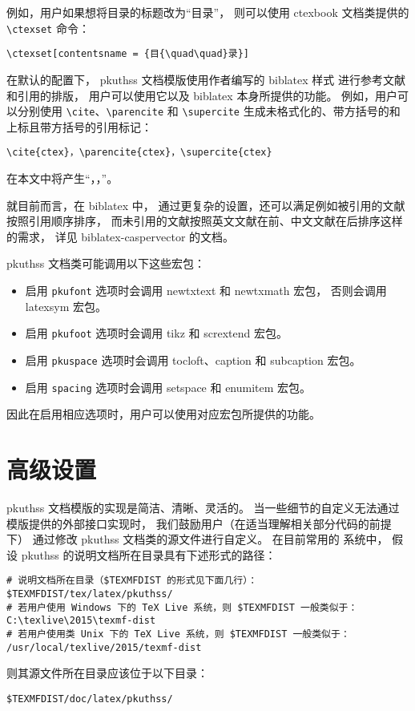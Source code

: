例如，用户如果想将目录的标题改为“目{\quad\quad}录”，
则可以使用 ctexbook 文档类提供的 \verb|\ctexset| 命令：
\begin{Verbatim}[frame = single]
\ctexset[contentsname = {目{\quad\quad}录}]
\end{Verbatim}

在默认的配置下，%
pkuthss 文档模版使用作者编写的 biblatex\supercite{biblatex} 样式%
\mbox{\supercite{biblatex-caspervector}}进行参考文献和引用的排版，
用户可以使用它以及 biblatex 本身所提供的功能。
例如，用户可以分别使用 \verb|\cite|、\verb|\parencite| 和 \verb|\supercite|
生成未格式化的、带方括号的和上标且带方括号的引用标记：
\begin{Verbatim}[frame = single]
\cite{ctex}，\parencite{ctex}，\supercite{ctex}
\end{Verbatim}
在本文中将产生“\cite{ctex}，\parencite{ctex}，\supercite{ctex}”。

就目前而言，在 biblatex 中，
通过更复杂的设置，还可以满足例如被引用的文献按照引用顺序排序，
而未引用的文献按照英文文献在前、中文文献在后排序这样的需求，
详见 biblatex-caspervector 的文档\supercite{biblatex-caspervector}。

pkuthss 文档类可能调用以下这些宏包：
\begin{itemize}
	\item 启用 \verb|pkufont| 选项时会调用
		newtxtext 和 newtxmath\supercite{newtx} 宏包，
		否则会调用 latexsym\supercite{latexsym} 宏包。
	\item 启用 \verb|pkufoot| 选项时会调用
		tikz\supercite{tikz} 和 scrextend\supercite{scrextend} 宏包。
	\item 启用 \verb|pkuspace| 选项时会调用
		tocloft\supercite{tocloft}、caption\supercite{caption} 和
		subcaption\supercite{subcaption} 宏包。
	\item 启用 \verb|spacing| 选项时会调用 setspace 和
		enumitem\supercite{enumitem} 宏包。
\end{itemize}
因此在启用相应选项时，用户可以使用对应宏包所提供的功能。

\section{高级设置}\label{sec:advanced}

pkuthss 文档模版的实现是简洁、清晰、灵活的。
当一些细节的自定义无法通过模版提供的外部接口实现时，
我们鼓励用户（在适当理解相关部分代码的前提下）
通过修改 pkuthss 文档类的源文件进行自定义。
在目前常用的  系统中，
假设 pkuthss 的说明文档所在目录具有下述形式的路径：
\begin{Verbatim}[frame = single]
# 说明文档所在目录（$TEXMFDIST 的形式见下面几行）：
$TEXMFDIST/tex/latex/pkuthss/
# 若用户使用 Windows 下的 TeX Live 系统，则 $TEXMFDIST 一般类似于：
C:\texlive\2015\texmf-dist
# 若用户使用类 Unix 下的 TeX Live 系统，则 $TEXMFDIST 一般类似于：
/usr/local/texlive/2015/texmf-dist
\end{Verbatim}
则其源文件所在目录应该位于以下目录：
\begin{Verbatim}[frame = single]
$TEXMFDIST/doc/latex/pkuthss/
\end{Verbatim}

